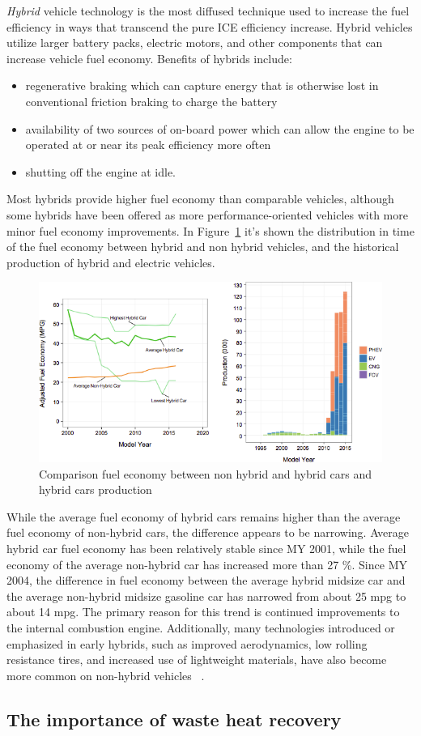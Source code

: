 \emph{Hybrid} vehicle technology is the most diffused technique used to increase the fuel efficiency in ways that transcend the pure ICE efficiency increase. Hybrid vehicles utilize larger battery packs, electric motors, and other components that can  increase vehicle fuel economy. Benefits of hybrids include:
\begin{itemize}
  \item regenerative braking which can capture energy that is otherwise lost in conventional friction braking to charge the battery
  \item availability of two sources of on-board power which can allow the engine to be operated at or  near its peak efficiency more often
  \item shutting off the engine at idle.
\end{itemize} 

Most hybrids provide higher fuel economy than comparable vehicles, although some hybrids have been offered as more performance-oriented vehicles with more minor fuel economy improvements. In Figure~\ref{fig:hybrids} it's shown the distribution in time of the fuel economy between hybrid and non hybrid vehicles, and the historical production of hybrid and electric vehicles.

\begin{figure}[ht]
  \centering
  \includegraphics[width=\textwidth]{figures/review/hybrid.png}
  \caption{Comparison fuel economy between non hybrid and hybrid cars and hybrid cars production \label{fig:hybrids} }
\end{figure}


While the average fuel economy of hybrid cars remains higher than the average fuel economy  of non-hybrid cars, the difference appears to be narrowing. Average hybrid car fuel economy  has been relatively stable since MY 2001, while the fuel economy of the average non-hybrid car has increased more than 27 \%. Since MY 2004, the difference in fuel economy between the average hybrid midsize car and the average non-hybrid midsize gasoline car has narrowed from about 25 mpg to about 14 mpg. The primary reason for this trend is continued improvements to the internal combustion engine. Additionally, many technologies introduced or emphasized in early hybrids, such as improved aerodynamics, low rolling resistance tires, and increased use of lightweight materials, have also become more common on non-hybrid vehicles~\cite{EPA2016} .

\subsection{The importance of waste heat recovery}

